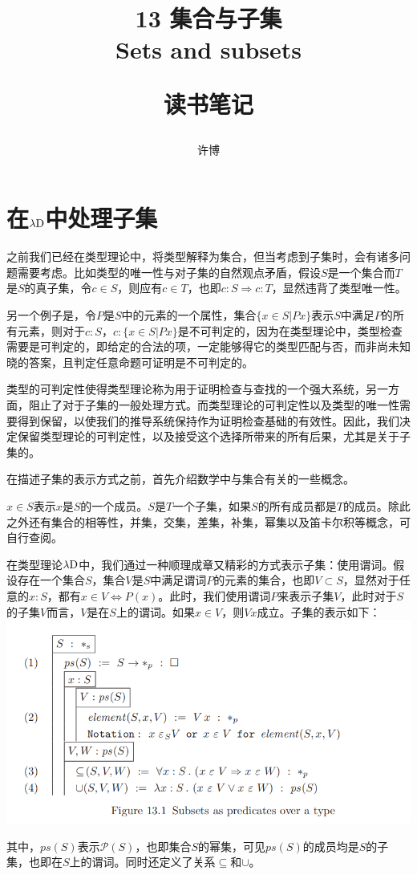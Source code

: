 \documentclass[UTF8]{article}
\title{13 集合与子集\\Sets and subsets\\[2ex]\begin{large}读书笔记\end{large}}
\author{许博}
\date{}
\begin{document}
\maketitle
	\section{在$\lambda{\rm D}$中处理子集}
	\noindent
	之前我们已经在类型理论中，将类型解释为集合，但当考虑到子集时，会有诸多问题需要考虑。比如类型的唯一性与对子集的自然观点矛盾，假设$S$是一个集合而$T$是$S$的真子集，令$c\in S$，则应有$c\in T$，也即$c:S\Rightarrow c:T$，显然违背了类型唯一性。
		
		另一个例子是，令$P$是$S$中的元素的一个属性，集合$\{x\in S|Px\}$表示$S$中满足$P$的所有元素，则对于$c:S$，$c:\{x\in S|Px\}$是不可判定的，因为在类型理论中，类型检查需要是可判定的，即给定的合法的项，一定能够得它的类型匹配与否，而非尚未知晓的答案，且判定任意命题可证明是不可判定的。
		
		类型的可判定性使得类型理论称为用于证明检查与查找的一个强大系统，另一方面，阻止了对于子集的一般处理方式。而类型理论的可判定性以及类型的唯一性需要得到保留，以使我们的推导系统保持作为证明检查基础的有效性。因此，我们决定保留类型理论的可判定性，以及接受这个选择所带来的所有后果，尤其是关于子集的。
		
		在描述子集的表示方式之前，首先介绍数学中与集合有关的一些概念。
		
		$x\in S$表示$x$是$S$的一个成员。$S$是$T$一个子集，如果$S$的所有成员都是$T$的成员。除此之外还有集合的相等性，并集，交集，差集，补集，幂集以及笛卡尔积等概念，可自行查阅。
		
		在类型理论$\lambda{\rm D}$中，我们通过一种顺理成章又精彩的方式表示子集：使用谓词。假设存在一个集合$S$，集合$V$是$S$中满足谓词$P$的元素的集合，也即$V\subset S$，显然对于任意的$x:S$，都有$x\in V\Leftrightarrow P(x)$。此时，我们使用谓词$P$来表示子集$V$，此时对于$S$的子集$V$而言，$V$是在$S$上的谓词。如果$x\in V$，则$Vx$成立。子集的表示如下：\\
		\includegraphics[width=0.93\linewidth]{"../imgs/13-1.png"}
		
		其中，$ps(S)$表示$\mathcal{P}(S)$，也即集合$S$的幂集，可见$ps(S)$的成员均是$S$的子集，也即在$S$上的谓词。同时还定义了关系$\subseteq$和$\cup$。
\end{document}

